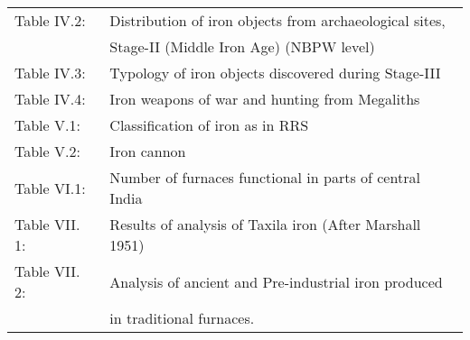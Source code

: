{\begin{longtable}{ll}
Table IV.2:	& Distribution of iron objects from archaeological sites,\\[2pt]
            & Stage-II (Middle Iron Age) (NBPW level)\\[2pt]

Table IV.3:&	Typology of iron objects discovered during Stage-III\\[2pt]

Table IV.4:	& Iron weapons of war and hunting from Megaliths\\[2pt]

Table V.1: & Classification of iron as in RRS\\[2pt]

Table V.2:& Iron cannon\\[2pt]

Table VI.1:& Number of furnaces functional in parts of central India\\[2pt]

Table VII. 1:& Results of analysis of Taxila iron (After Marshall 1951)\\[2pt]

Table VII. 2: & Analysis of ancient and Pre-industrial iron produced\\[2pt]
              & in traditional furnaces.\\
\end{longtable}}
